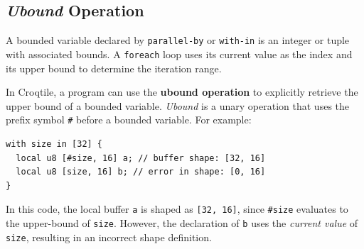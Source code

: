 \subsection*{\emph{Ubound} Operation}

A bounded variable declared by \texttt{parallel-by} or \texttt{with-in} is an integer or tuple with associated bounds. A \texttt{foreach} loop uses its current value as the index and its upper bound to determine the iteration range.

In Croqtile, a program can use the \textbf{ubound operation} to explicitly retrieve the upper bound of a bounded variable. \emph{Ubound} is a unary operation that uses the prefix symbol \texttt{\#} before a bounded variable. For example:

\begin{lstlisting}[language=croqtile,caption={Ubound Operation}]
with size in [32] {
  local u8 [#size, 16] a; // buffer shape: [32, 16]
  local u8 [size, 16] b; // error in shape: [0, 16]
}
\end{lstlisting}

In this code, the local buffer \texttt{a} is shaped as \texttt{[32, 16]}, since \texttt{\#size} evaluates to the upper-bound of \texttt{size}. However, the declaration of \texttt{b} uses the \emph{current value} of \texttt{size}, resulting in an incorrect shape definition.
